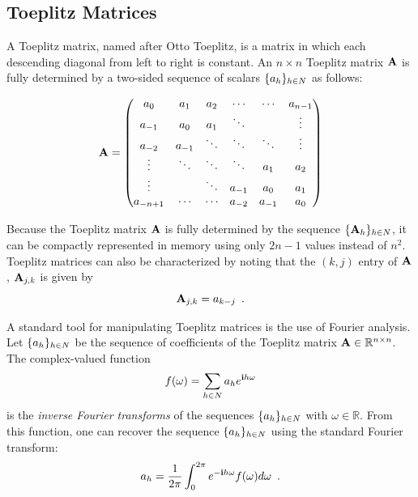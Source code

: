 
\subsection{Toeplitz Matrices}
\label{subsection:ch2-toeplitz_matrices}

A Toeplitz matrix, named after Otto Toeplitz, is a matrix in which each descending diagonal from left to right is constant.
An $n\times n$ Toeplitz matrix $\mathbf{A}$ is fully determined by a two-sided sequence of scalars $\{a_h\}_{h \in N}$ as follows:

\begin{equation}
  \mathbf{A} =
  \begin{pmatrix}
    a_0 & a_{1} & a_{2} & \cdots & \cdots & a_{n-1} \\
    a_{-1} & a_0 & a_{1} & \ddots & & \vdots \\
    a_{-2} & a_{-1} & \ddots & \ddots & \ddots & \vdots \\ 
    \vdots & \ddots & \ddots & \ddots & a_{1} & a_{2} \\
    \vdots & & \ddots & a_{-1} & a_{0} & a_{1} \\
    a_{-n+1} & \cdots & \cdots & a_{-2} & a_{-1} & a_0
  \end{pmatrix}
\end{equation}

\noindent
Because the Toeplitz matrix $\mathbf{A}$ is fully determined by the sequence $\{\mathbf{A}_h\}_{h \in N}$, it can be compactly represented in memory using only $2n-1$ values instead of $n^2$.
Toeplitz matrices can also be characterized by noting that the $(k,j)$ entry of $\mathbf{A}$, $\mathbf{A}_{j,k}$ is given by
\begin{equation}
  \mathbf{A}_{j,k} = a_{k-j} \enspace.
\end{equation}

\noindent
A standard tool for manipulating Toeplitz matrices is the use of Fourier analysis.
Let $\{a_h\}_{h \in N}$ be the sequence of coefficients of the Toeplitz matrix $\mathbf{A} \in \mathbb{R}^{n\times n}$.
The complex-valued function 
\begin{equation}
  f(\omega) = \sum_{h \in N} a_h e^{\mathbf{i} h \omega}
\end{equation}
is the \emph{inverse Fourier transforms} of the sequences $\{a_h\}_{h \in N}$ with $\omega \in \mathbb{R}$.
From this function, one can recover the sequence $\{a_h\}_{h \in N}$ using the standard Fourier transform:
\begin{equation}
  a_h = \frac{1}{2\pi} \int_0^{2\pi} e^{-\mathbf{i} h \omega} f(\omega) d\omega \enspace. 
\end{equation}

